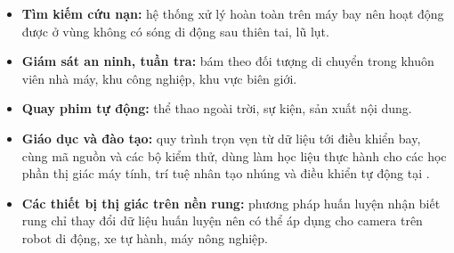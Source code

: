 \begin{itemize}
\item \textbf{Tìm kiếm cứu nạn:} hệ thống xử lý hoàn toàn trên máy bay nên hoạt động được ở vùng không có sóng di động sau thiên tai, lũ lụt.
\item \textbf{Giám sát an ninh, tuần tra:} bám theo đối tượng di chuyển trong khuôn viên nhà máy, khu công nghiệp, khu vực biên giới.
\item \textbf{Quay phim tự động:} thể thao ngoài trời, sự kiện, sản xuất nội dung.
\item \textbf{Giáo dục và đào tạo:} quy trình trọn vẹn từ dữ liệu tới điều khiển bay, cùng mã nguồn và các bộ kiểm thử, dùng làm học liệu thực hành cho các học phần thị giác máy tính, trí tuệ nhân tạo nhúng và điều khiển tự động tại \truong.
\item \textbf{Các thiết bị thị giác trên nền rung:} phương pháp huấn luyện nhận biết rung chỉ thay đổi dữ liệu huấn luyện nên có thể áp dụng cho camera trên robot di động, xe tự hành, máy nông nghiệp.
\end{itemize}
